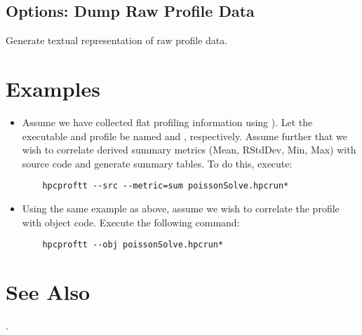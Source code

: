 \documentclass[english]{article}
\begin{document}
\subsection{Options: Dump Raw Profile Data}

\begin{Description}
\item[\Opt{--dump}] Generate textual representation of raw profile data.
\end{Description}


\section{Examples}

\begin{itemize}

\item Assume we have collected flat profiling information using ).
Let the executable and profile be named  and , respectively.
Assume further that we wish to correlate derived summary metrics (Mean, RStdDev, Min, Max) with source code and generate summary tables.
To do this, execute:
\begin{verbatim}
    hpcproftt --src --metric=sum poissonSolve.hpcrun*
\end{verbatim}

\item Using the same example as above, assume we wish to correlate the profile with object code.  Execute the following command:
\begin{verbatim}
    hpcproftt --obj poissonSolve.hpcrun*
\end{verbatim}

\end{itemize}


\section{See Also}

.
\end{document}
